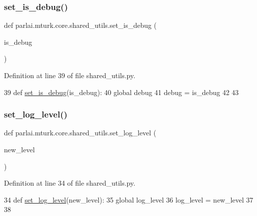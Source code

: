 \subsubsection{\texorpdfstring{set\+\_\+is\+\_\+debug()}{set\_is\_debug()}}
{\footnotesize\ttfamily def parlai.\+mturk.\+core.\+shared\+\_\+utils.\+set\+\_\+is\+\_\+debug (\begin{DoxyParamCaption}\item[{}]{is\+\_\+debug }\end{DoxyParamCaption})}



Definition at line 39 of file shared\+\_\+utils.\+py.


\begin{DoxyCode}
39 \textcolor{keyword}{def }\hyperlink{namespaceparlai_1_1mturk_1_1core_1_1shared__utils_a8446a65c83fee3ccdfb7484ff5f3eedd}{set\_is\_debug}(is\_debug):
40     \textcolor{keyword}{global} debug
41     debug = is\_debug
42 
43 
\end{DoxyCode}
\mbox{\label{namespaceparlai_1_1mturk_1_1core_1_1shared__utils_ac8a4f9a9107ed8eca14da5117922fbee}} 
\subsubsection{\texorpdfstring{set\+\_\+log\+\_\+level()}{set\_log\_level()}}
{\footnotesize\ttfamily def parlai.\+mturk.\+core.\+shared\+\_\+utils.\+set\+\_\+log\+\_\+level (\begin{DoxyParamCaption}\item[{}]{new\+\_\+level }\end{DoxyParamCaption})}



Definition at line 34 of file shared\+\_\+utils.\+py.


\begin{DoxyCode}
34 \textcolor{keyword}{def }\hyperlink{namespaceparlai_1_1mturk_1_1core_1_1shared__utils_ac8a4f9a9107ed8eca14da5117922fbee}{set\_log\_level}(new\_level):
35     \textcolor{keyword}{global} log\_level
36     log\_level = new\_level
37 
38 
\end{DoxyCode}


